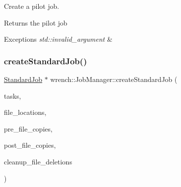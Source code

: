Create a pilot job. 

\begin{DoxyReturn}{Returns}
the pilot job
\end{DoxyReturn}

\begin{DoxyExceptions}{Exceptions}
{\em std\+::invalid\+\_\+argument} & \\
\hline
\end{DoxyExceptions}
\mbox{\label{classwrench_1_1_job_manager_a7f3873e56c8813c90b66683690d6b328}} 
\subsubsection{\texorpdfstring{create\+Standard\+Job()}{createStandardJob()}\hspace{0.1cm}{\footnotesize\ttfamily [1/3]}}
{\footnotesize\ttfamily \hyperlink{classwrench_1_1_standard_job}{Standard\+Job} $\ast$ wrench\+::\+Job\+Manager\+::create\+Standard\+Job (\begin{DoxyParamCaption}\item[{std\+::vector$<$ \hyperlink{classwrench_1_1_workflow_task}{Workflow\+Task} $\ast$$>$}]{tasks,  }\item[{std\+::map$<$ \hyperlink{classwrench_1_1_workflow_file}{Workflow\+File} $\ast$, \hyperlink{classwrench_1_1_storage_service}{Storage\+Service} $\ast$$>$}]{file\+\_\+locations,  }\item[{std\+::set$<$ std\+::tuple$<$ \hyperlink{classwrench_1_1_workflow_file}{Workflow\+File} $\ast$, \hyperlink{classwrench_1_1_storage_service}{Storage\+Service} $\ast$, \hyperlink{classwrench_1_1_storage_service}{Storage\+Service} $\ast$$>$$>$}]{pre\+\_\+file\+\_\+copies,  }\item[{std\+::set$<$ std\+::tuple$<$ \hyperlink{classwrench_1_1_workflow_file}{Workflow\+File} $\ast$, \hyperlink{classwrench_1_1_storage_service}{Storage\+Service} $\ast$, \hyperlink{classwrench_1_1_storage_service}{Storage\+Service} $\ast$$>$$>$}]{post\+\_\+file\+\_\+copies,  }\item[{std\+::set$<$ std\+::tuple$<$ \hyperlink{classwrench_1_1_workflow_file}{Workflow\+File} $\ast$, \hyperlink{classwrench_1_1_storage_service}{Storage\+Service} $\ast$$>$$>$}]{cleanup\+\_\+file\+\_\+deletions }\end{DoxyParamCaption})}



